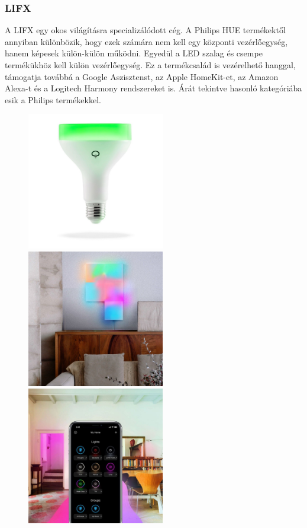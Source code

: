 \documentclass[../main.tex]{subfiles}
\begin{document}
            
        \subsubsection{LIFX}
            A LIFX egy okos világításra specializálódott cég. A Philips HUE termékektől annyiban különbözik, hogy ezek számára nem kell egy központi vezérlőegység, hanem képesek külön-külön működni. Egyedül a LED szalag és csempe termékükhöz kell külön vezérlőegység. Ez a termékcsalád is vezérelhető hanggal, támogatja továbbá a Google Aszisztenst, az Apple HomeKit-et, az Amazon Alexa-t és a Logitech Harmony rendszereket is. Árát tekintve hasonló kategóriába esik a Philips termékekkel. 
            
            \begin{figure}[h!]
                \centering
                    \includegraphics[height=6cm]{irodalom_res/LIFX_bulb}
                    \includegraphics[height=6cm]{irodalom_res/LIFX_tile}
                    \includegraphics[height=6cm]{irodalom_res/LIFX_app1}

\end{figure}
\end{document}
